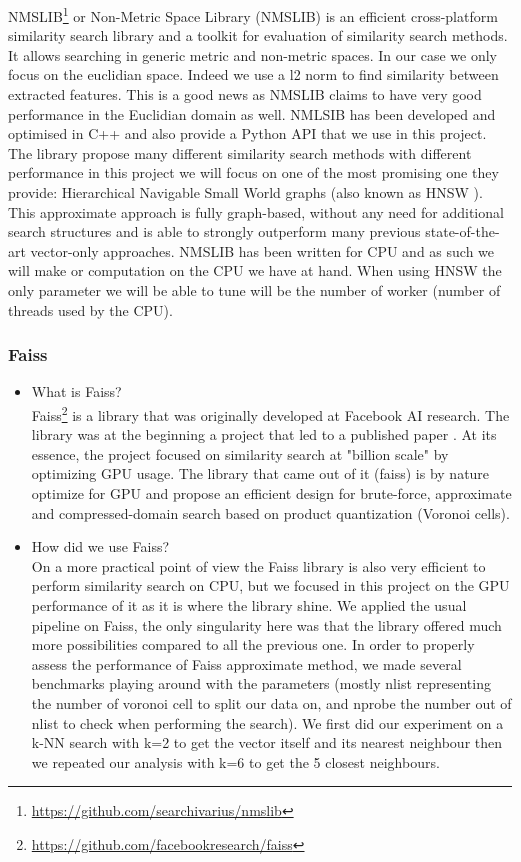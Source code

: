 \documentclass[a4paper]{article}
\begin{document}
NMSLIB\footnote{\url{https://github.com/searchivarius/nmslib}} or Non-Metric Space Library (NMSLIB) is an efficient cross-platform similarity search library and a toolkit for evaluation of similarity search methods. It allows searching in generic metric and non-metric spaces. In our case we only focus on the euclidian space. Indeed we use a l2 norm to find similarity between extracted features. This is a good news as NMSLIB claims to have very good performance in the Euclidian domain as well. NMLSIB has been developed and optimised in C++ and also provide a Python API that we use in this project. The library propose many different similarity search methods with different performance in this project we will focus on one of the most promising one they provide: Hierarchical Navigable Small World graphs (also known as HNSW \cite{HNSW}). This approximate approach is fully graph-based, without any need for additional search structures and is able to strongly outperform many previous state-of-the-art vector-only approaches. NMSLIB has been written for CPU and as such we will make or computation on the CPU we have at hand. When using HNSW the only parameter we will be able to tune will be the number of worker (number of threads used by the CPU).

\subsubsection{Faiss}
\begin{itemize}
	\item What is Faiss? \vspace{5pt} \\
	Faiss\footnote{\url{https://github.com/facebookresearch/faiss}} is a library that was originally developed at Facebook AI research. The library was at the beginning a project that led to a published paper \cite{faiss}. At its essence, the project focused on similarity search at "billion scale" by optimizing GPU usage. The library that came out of it (faiss) is by nature optimize for GPU and propose an efficient design for brute-force, approximate and compressed-domain search based on product quantization (Voronoi cells).
	\item How did we use Faiss? \vspace{5pt} \\
	On a more practical point of view the Faiss library is also very efficient to perform similarity search on CPU, but we focused in this project on the GPU performance of it as it is where the library shine. We applied the usual pipeline on Faiss, the only singularity here was that the library offered much more possibilities compared to all the previous one. In order to properly assess the performance of Faiss approximate method, we made several benchmarks playing around with the parameters (mostly nlist representing the number of voronoi cell to split our data on, and nprobe the number out of nlist to check when performing the search). We first did our experiment on a k-NN search with k=2 to get the vector itself and its nearest neighbour then we repeated our analysis with k=6 to get the 5 closest neighbours.
\end{itemize}
\end{document}
